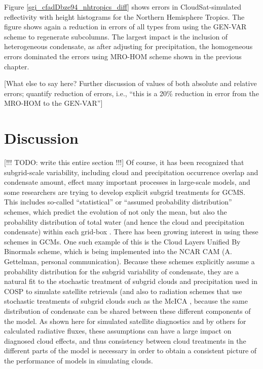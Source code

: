 Figure \ref{sgi_cfadDbze94_nhtropics_diff} shows errors in CloudSat-simulated reflectivity with height histograms for the Northern Hemisphere Tropics. The figure shows again a reduction in errors of all types from using the GEN-VAR scheme to regenerate subcolumns. The largest impact is the inclusion of heterogeneous condensate, as after adjusting for precipitation, the homogeneous errors dominated the errors using MRO-HOM scheme shown in the previous chapter. 

[What else to say here? Further discussion of values of both absolute and relative errors; quantify reduction of errors, i.e., ``this is a 20\% reduction in error from the MRO-HOM to the GEN-VAR'']

\section{Discussion}
\label{subgrid2_discussion_section}
[!!! TODO: write this entire section !!!]
Of course, it has been recognized that subgrid-scale variability, including cloud and precipitation occurrence overlap and condensate amount, effect many important processes in large-scale models, and some researchers are trying to develop explicit subgrid treatments for GCMS. This includes so-called ``statistical'' or ``assumed probability distribution'' schemes, which predict the evolution of not only the mean, but also the probability distribution of total water (and hence the cloud and precipitation condensate) within each grid-box \citep[e.g.,][]{tompkins_2002}. There has been growing interest in using these schemes in GCMs. One such example of this is the Cloud Layers Unified By Binormals \citep[CLUBB;][]{golaz_et_al_2002} scheme, which is being implemented into the NCAR CAM (A. Gettelman, personal communication). Because these schemes explicitly assume a probability distribution for the subgrid variability of condensate, they are a natural fit to the stochastic treatment of subgrid clouds and precipitation used in COSP to simulate satellite retrievals (and also to radiation schemes that use stochastic treatments of subgrid clouds such as the McICA \citep{pincus_et_al_2003}, because the same distribution of condensate can be shared between these different components of the model. As shown here for simulated satellite diagnostics and by others for calculated radiative fluxes, these assumptions can have a large impact on diagnosed cloud effects, and thus consistency between cloud treatments in the different parts of the model is necessary in order to obtain a consistent picture of the performance of models in simulating clouds.

